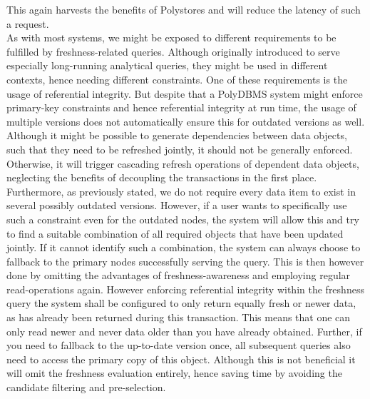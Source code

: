 This again harvests the benefits of Polystores and will reduce the latency of such a request.\\
As with most systems, we might be exposed to different requirements to be fulfilled by freshness-related queries. 
Although originally introduced to serve especially long-running analytical queries, they might be used in different contexts, hence needing different constraints.
One of these requirements is the usage of referential integrity.
But despite that a PolyDBMS system might enforce primary-key constraints and hence referential integrity at run time, the usage of multiple versions does not automatically
ensure this for outdated versions as well. Although it might be possible to generate dependencies between data objects, such that they need to be refreshed jointly,
it should not be generally enforced. Otherwise, it will trigger cascading refresh operations of dependent data objects, neglecting the benefits of decoupling the transactions 
in the first place. Furthermore, as previously stated, we do not require every data item to exist in several possibly outdated versions.  
However, if a user wants to specifically use such a constraint even for the outdated nodes, the system will allow this and try to find a suitable combination of all required 
objects that have been updated jointly. If it cannot identify such a combination, the system can always choose to fallback to the primary nodes successfully serving the query.
This is then however done by omitting the advantages of freshness-awareness and employing regular read-operations again.
However enforcing referential integrity within the freshness query the system shall be configured to only return equally fresh or newer data, 
as has already been returned during this transaction. This means that one can only read newer and never data older than you have already obtained.
Further, if you need to fallback to the up-to-date version once, all subsequent queries also need to access the primary copy of this object. 
Although this is not beneficial it will omit the freshness evaluation entirely, hence saving time by avoiding the candidate filtering and pre-selection.

